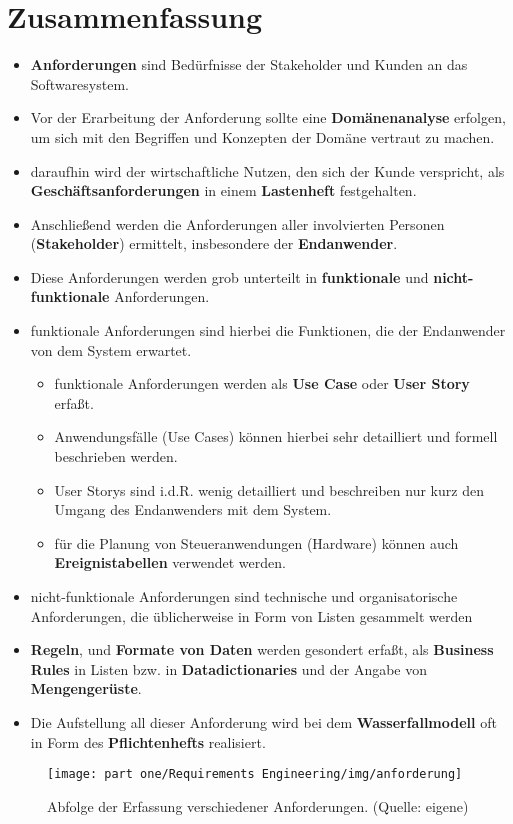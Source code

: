 \section{Zusammenfassung}



\begin{itemize}
    \item \textbf{Anforderungen} sind Bedürfnisse der Stakeholder und Kunden an das Softwaresystem.
    \item Vor der Erarbeitung der Anforderung sollte eine \textbf{Domänenanalyse} erfolgen, um sich mit den Begriffen und Konzepten der Domäne vertraut zu machen.
    \item daraufhin wird der wirtschaftliche Nutzen, den sich der Kunde verspricht, als \textbf{Geschäftsanforderungen} in einem \textbf{Lastenheft} festgehalten.
    \item Anschließend werden die Anforderungen aller involvierten Personen (\textbf{Stakeholder}) ermittelt, insbesondere der \textbf{Endanwender}.
    \item Diese Anforderungen werden grob unterteilt in \textbf{funktionale} und \textbf{nicht-funktionale} Anforderungen.
    \item funktionale Anforderungen sind hierbei die Funktionen, die der Endanwender von dem System erwartet.
        \begin{itemize}
            \item funktionale Anforderungen werden als \textbf{Use Case} oder \textbf{User Story} erfaßt.
            \item Anwendungsfälle (Use Cases) können hierbei sehr detailliert und formell beschrieben werden.
            \item User Storys sind i.d.R. wenig detailliert und beschreiben nur kurz den Umgang des Endanwenders mit dem System.
            \item für die Planung von Steueranwendungen (Hardware) können auch \textbf{Ereignistabellen} verwendet werden.
        \end{itemize}
    \item nicht-funktionale Anforderungen sind technische und organisatorische Anforderungen, die üblicherweise in Form von Listen gesammelt werden
    \item \textbf{Regeln}, und \textbf{Formate von Daten} werden gesondert erfaßt, als \textbf{Business Rules} in Listen bzw. in \textbf{Datadictionaries} und der Angabe von \textbf{Mengengerüste}.
    \item Die Aufstellung all dieser Anforderung wird bei dem \textbf{Wasserfallmodell} oft in Form des \textbf{Pflichtenhefts} realisiert.
\end{itemize}


\begin{figure}
    \centering
    \texttt{[image: part one/Requirements Engineering/img/anforderung]}
    \caption{Abfolge der Erfassung verschiedener Anforderungen. (Quelle: eigene)}
    \label{fig:anforderung}
\end{figure}